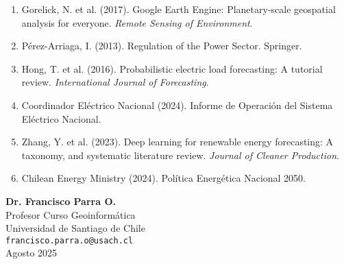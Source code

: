 \documentclass[12pt,a4paper]{article}
\begin{document}
\begin{enumerate}
    \item Gorelick, N. et al. (2017). Google Earth Engine: Planetary-scale geospatial analysis for everyone. \textit{Remote Sensing of Environment}.
    
    \item Pérez-Arriaga, I. (2013). Regulation of the Power Sector. Springer.
    
    \item Hong, T. et al. (2016). Probabilistic electric load forecasting: A tutorial review. \textit{International Journal of Forecasting}.
    
    \item Coordinador Eléctrico Nacional (2024). Informe de Operación del Sistema Eléctrico Nacional.
    
    \item Zhang, Y. et al. (2023). Deep learning for renewable energy forecasting: A taxonomy, and systematic literature review. \textit{Journal of Cleaner Production}.
    
    \item Chilean Energy Ministry (2024). Política Energética Nacional 2050.
\end{enumerate}

\vspace{2cm}

\begin{flushright}
\textbf{Dr. Francisco Parra O.}\\
Profesor Curso Geoinformática\\
Universidad de Santiago de Chile\\
\texttt{francisco.parra.o@usach.cl}\\
\vspace{0.5cm}
Agosto 2025
\end{flushright}
\end{document}
